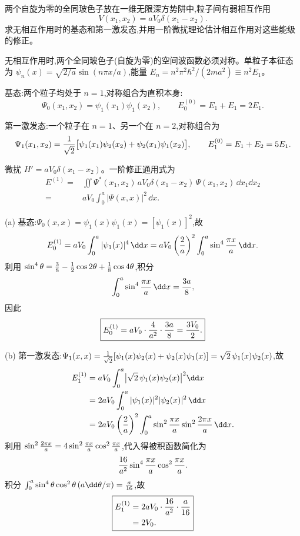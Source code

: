 \begin{question}
两个自旋为零的全同玻色子放在一维无限深方势阱中,粒子间有弱相互作用
\[
V(x_1,x_2)=aV_0\delta(x_1-x_2).
\]
求无相互作用时的基态和第一激发态,并用一阶微扰理论估计相互作用对这些能级的修正。
\begin{solution}
无相互作用时,两个全同玻色子(自旋为零)的空间波函数必须对称。单粒子本征态为 $\psi_n(x)=\sqrt{2/a}\sin(n\pi x/a)$,能量 $E_n=n^2\pi^2\hbar^2/(2ma^2)\equiv n^2E_1$。

基态:两个粒子均处于 $n=1$,对称组合为直积本身:
\[
\Psi_0(x_1,x_2)=\psi_1(x_1)\psi_1(x_2),\qquad
E_0^{(0)}=E_1+E_1=2E_1.
\]

第一激发态:一个粒子在 $n=1$、另一个在 $n=2$,对称组合为
\[
\Psi_1(x_1,x_2)={1\over\sqrt2}\bigl[\psi_1(x_1)\psi_2(x_2)+\psi_2(x_1)\psi_1(x_2)\bigr],
\qquad
E_1^{(0)}=E_1+E_2=5E_1.
\]

微扰 $H'=aV_0\delta(x_1-x_2)$。一阶修正通用式为
\[
\begin{aligned}E^{(1)}={}&\iint \Psi^*(x_1,x_2)\,aV_0\delta(x_1-x_2)\,\Psi(x_1,x_2)\,\dd x_1\dd x_2\\={}&aV_0\int_0^a |\Psi(x,x)|^2\,\dd x.\end{aligned}
\]

(a) 基态:$\Psi_0(x,x)=\psi_1(x)\psi_1(x)=[\psi_1(x)]^2$,故
\[
E_0^{(1)}=aV_0\int_0^a |\psi_1(x)|^4\,\dd x
=aV_0\left({2\over a}\right)^2\int_0^a \sin^4{\pi x\over a}\,\dd x.
\]
利用 $\sin^4\theta={3\over8}-{1\over2}\cos2\theta+{1\over8}\cos4\theta$,积分
\[
\int_0^a \sin^4{\pi x\over a}\,\dd x={3a\over8},
\]
因此
\[
\boxed{E_0^{(1)}=aV_0\cdot{4\over a^2}\cdot{3a\over8}={3V_0\over2}.}
\]

(b) 第一激发态:$\Psi_1(x,x)={1\over\sqrt2}[\psi_1(x)\psi_2(x)+\psi_2(x)\psi_1(x)]=\sqrt2\,\psi_1(x)\psi_2(x)$,故
\[
\begin{aligned}E_1^{(1)}={}&aV_0\int_0^a \bigl|\sqrt2\,\psi_1(x)\psi_2(x)\bigr|^2\dd x\\={}&2aV_0\int_0^a |\psi_1(x)|^2|\psi_2(x)|^2\,\dd x\\={}&2aV_0\left({2\over a}\right)^2\int_0^a \sin^2{\pi x\over a}\sin^2{2\pi x\over a}\,\dd x.\end{aligned}
\]
利用 $\sin^2{2\pi x\over a}=4\sin^2{\pi x\over a}\cos^2{\pi x\over a}$,代入得被积函数简化为
\[
{16\over a^2}\sin^4{\pi x\over a}\cos^2{\pi x\over a}.
\]
积分 $\int_0^a\sin^4\theta\cos^2\theta\,(a\dd\theta/\pi)={a\over16}$,故
\[
\boxed{\begin{aligned}E_1^{(1)}&=2aV_0\cdot{16\over a^2}\cdot{a\over16}\\&=2V_0.\end{aligned}}
\]
\end{solution}
\end{question}

